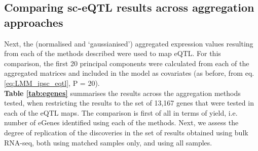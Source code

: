 \subsection{Comparing sc-eQTL results across aggregation approaches}

Next, the (normalised and `gaussianised') aggregated expression values resulting from each of the methods described were used to map eQTL.
For this comparison, the first 20 principal components were calculated from each of the aggregated matrices and included in the model as covariates (as before, from eq. \eqref{eq:LMM_ipsc_eqtl}, P = 20).
\\


\textbf{Table \ref{tab:egenes}} summarises the results across the aggregation methods tested, when restricting the results to the set of 13,167 genes that were tested in each of the eQTL maps.
The comparison is first of all in terms of yield, i.e. number of eGenes identified using each of the methods.
Next, we assess the degree of replication of the discoveries in the set of results obtained using bulk RNA-seq, both using matched samples only, and using all samples.\\





